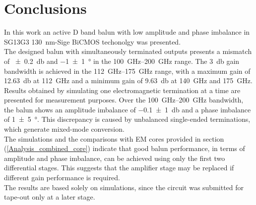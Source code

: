 \section{Conclusions}
\label{sec:Conclusion}
In this work an active D band balun with low amplitude and phase imbalance in SG13G3 \SI{130}{\nano\meter}-Sige BiCMOS techonolgy was presented.\\
  
The designed balun with simultaneously terminated outputs presents a mismatch of \SI{\pm 0.2}{\decibel} and \SI[separate-uncertainty=true]{-1 \pm 1}{\degree} in the \SIrange{100}{200}{\giga\hertz} range.
The \SI{3}{\decibel} gain bandwidth is achieved in the \SIrange{112}{175}{\giga\hertz} range, with a maximum gain of \SI{12.63}{\decibel} at \SI{112}{\giga\hertz} and a minimum gain of \SI{9.63}{\decibel} at \SI{140}{\giga\hertz} and \SI{175}{\giga\hertz}.\\

Results obtained by simulating one electromagnetic termination at a time are presented for measurement purposes. Over the \SIrange{100}{200}{\giga\hertz} bandwidth, the balun shows an amplitude imbalance of \SI[separate-uncertainty=true]{-0.1 \pm 1}{\decibel} and a phase imbalance of \SI[separate-uncertainty=true]{1 \pm 5}{\degree}. This discrepancy is caused by unbalanced single-ended terminations, which generate mixed-mode conversion.\\

The simulations and the comparisons with EM cores provided in section (\ref{Analysis_combined_core}) indicate that good balun performance, in terms of amplitude and phase imbalance, can be achieved using only the first two differential stages. This suggests that the amplifier stage may be replaced if different gain performance is required.\\

The results are based solely on simulations, since the circuit was submitted for tape-out only at a later stage.

